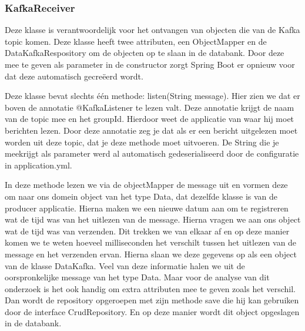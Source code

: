\subsubsection{KafkaReceiver}
Deze klasse is verantwoordelijk voor het ontvangen van objecten die van de Kafka topic komen. Deze klasse heeft twee attributen, een ObjectMapper en de DataKafkaRespository om de objecten op te slaan in de databank. Door deze mee te geven als parameter in de constructor zorgt Spring Boot er opnieuw voor dat deze automatisch gecreëerd wordt.

Deze klasse bevat slechts één methode: listen(String message). Hier zien we dat er boven de annotatie @KafkaListener te lezen valt. Deze annotatie krijgt de naam van de topic mee en het groupId. Hierdoor weet de applicatie van waar hij moet berichten lezen. Door deze annotatie zeg je dat als er een bericht uitgelezen moet worden uit deze topic, dat je deze methode moet uitvoeren. De String die je meekrijgt als parameter werd al automatisch gedeserialiseerd door de configuratie in application.yml. 

In deze methode lezen we via de objectMapper de message uit en vormen deze om naar ons domein object van het type Data, dat dezelfde klasse is van de producer applicatie. Hierna maken we een nieuwe datum aan om te registreren wat de tijd was van het uitlezen van de message. Hierna vragen we aan ons object wat de tijd was van verzenden. Dit trekken we van elkaar af en op deze manier komen we te weten hoeveel milliseconden het verschilt tussen het uitlezen van de message en het verzenden ervan. Hierna slaan we deze gegevens op als een object van de klasse DataKafka. Veel van deze informatie halen we uit de oorspronkelijke message van het type Data. Maar voor de analyse van dit onderzoek is het ook handig om extra attributen mee te geven zoals het verschil. Dan wordt de repository opgeroepen met zijn methode save die hij kan gebruiken door de interface CrudRepository. En op deze manier wordt dit object opgeslagen in de databank.

